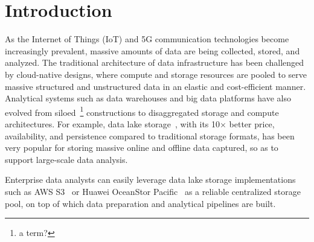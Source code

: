 \section{Introduction} 
\label{sec:intro}


As the Internet of Things (IoT) and 5G communication technologies become increasingly prevalent, massive amounts of data are being collected, stored, and analyzed.
 The traditional architecture of data infrastructure  has been challenged by cloud-native designs, where compute and storage resources are pooled to serve massive structured and unstructured data in an elastic and cost-efficient manner.
  Analytical systems such as data warehouses and big data platforms have also evolved from siloed~\footnote{a term?} constructions to disaggregated storage and compute architectures. For example, data lake storage~\cite{}, with its 10$\times$ better price, availability, and persistence compared to traditional storage formats, has been very popular for storing massive online and offline data captured, so as to support large-scale data analysis.

   Enterprise data analysts can easily leverage data lake storage implementations such as AWS S3~\cite{} or Huawei OceanStor Pacific~\cite{} as a reliable centralized  storage pool, on top of which  data preparation and analytical pipelines are built.

